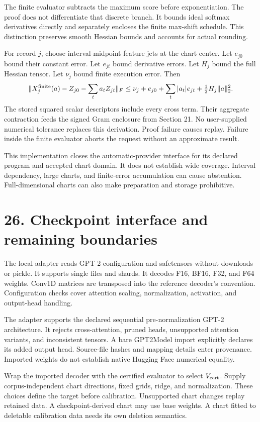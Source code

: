  The finite evaluator subtracts the maximum score before exponentiation. The proof does not differentiate that discrete branch. It bounds ideal softmax derivatives directly and separately encloses the finite max-shift schedule. This distinction preserves smooth Hessian bounds and accounts for actual rounding.

For record $j$, choose interval-midpoint feature jets at the chart center. Let $e_{j0}$ bound their constant error. Let $e_{jt}$ bound derivative errors. Let $H_j$ bound the full Hessian tensor. Let $\nu_j$ bound finite execution error. Then
\[
 \|X_j^{\rm finite}(a)-Z_{j0}-\sum_t a_tZ_{jt}\|_F
 \leq \nu_j+e_{j0}+\sum_t |a_t|e_{jt}
              +\tfrac12 H_j\|a\|_2^2.
\]
The stored squared scalar descriptors include every cross term. Their aggregate contraction feeds the signed Gram enclosure from Section 21. No user-supplied numerical tolerance replaces this derivation. Proof failure causes replay. Failure inside the finite evaluator aborts the request without an approximate result.

This implementation closes the automatic-provider interface for its declared program and accepted chart domain. It does not establish wide coverage. Interval dependency, large charts, and finite-error accumulation can cause abstention. Full-dimensional charts can also make preparation and storage prohibitive.

\newpage
\section*{26. Checkpoint interface and remaining boundaries}
The local adapter reads GPT-2 configuration and safetensors without downloads or pickle. It supports single files and shards. It decodes F16, BF16, F32, and F64 weights. Conv1D matrices are transposed into the reference decoder's convention. Configuration checks cover attention scaling, normalization, activation, and output-head handling.

The adapter supports the declared sequential pre-normalization GPT-2 architecture. It rejects cross-attention, pruned heads, unsupported attention variants, and inconsistent tensors. A bare GPT2Model import explicitly declares its added output head. Source-file hashes and mapping details enter provenance. Imported weights do not establish native Hugging Face numerical equality.

Wrap the imported decoder with the certified evaluator to select $V_{\rm cert}$. Supply corpus-independent chart directions, fixed grids, ridge, and normalization. These choices define the target before calibration. Unsupported chart changes replay retained data. A checkpoint-derived chart may use base weights. A chart fitted to deletable calibration data needs its own deletion semantics.

